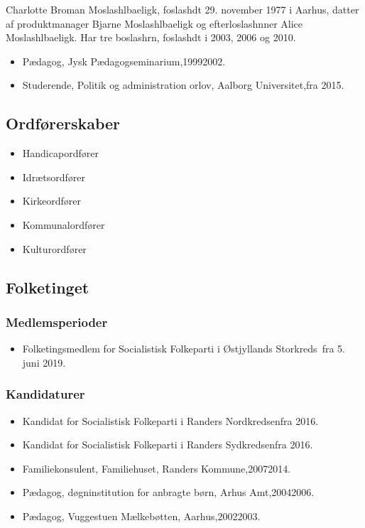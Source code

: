 \documentclass[11pt, a4paper]{awesome-cv}
\begin{document}
\makecvheader[R]
\makelettertitle
\begin{cvletter}
Charlotte Broman Moslashlbaeligk, foslashdt 29. november 1977 i Aarhus, datter af produktmanager Bjarne Moslashlbaeligk og efterloslashnner Alice Moslashlbaeligk. Har tre boslashrn, foslashdt i 2003, 2006 og 2010.

\begin{itemize}
\item Pædagog, Jysk Pædagogseminarium,19992002.
\item Studerende, Politik og administration orlov, Aalborg Universitet,fra 2015.
\end{itemize}
\subsection*{Ordførerskaber}
\begin{itemize}
\item Handicapordfører
\item Idrætsordfører
\item Kirkeordfører
\item Kommunalordfører
\item Kulturordfører
\end{itemize}
\subsection*{Folketinget}
\subsubsection*{Medlemsperioder}
\begin{itemize}
\item Folketingsmedlem for Socialistisk Folkeparti i Østjyllands Storkreds fra 5. juni 2019.
\end{itemize}
\subsubsection*{Kandidaturer}
\begin{itemize}
\item Kandidat for Socialistisk Folkeparti i Randers Nordkredsenfra 2016.
\item Kandidat for Socialistisk Folkeparti i Randers Sydkredsenfra 2016.
\end{itemize}
\begin{itemize}
\item Familiekonsulent, Familiehuset, Randers Kommune,20072014.
\item Pædagog, døgninstitution for anbragte børn, Arhus Amt,20042006.
\item Pædagog, Vuggestuen Mælkebøtten, Aarhus,20022003.
\end{itemize}
\end{cvletter}
\end{document}
